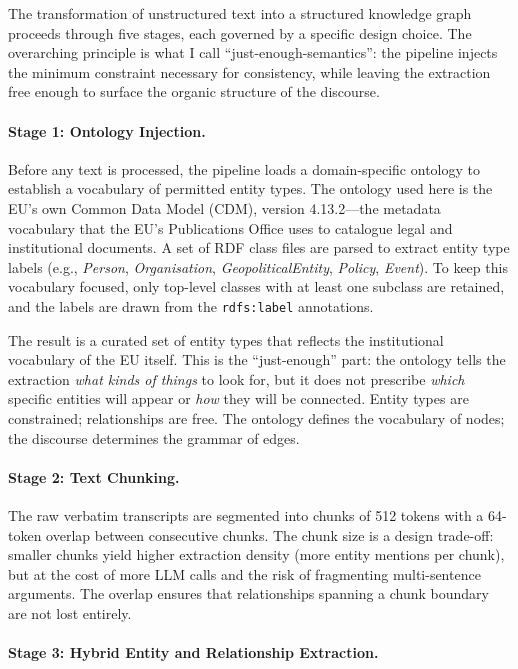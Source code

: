 \documentclass[11pt]{article}
\begin{document}
The transformation of unstructured text into a structured knowledge graph proceeds through five stages, each governed by a specific design choice. The overarching principle is what I call ``just-enough-semantics'': the pipeline injects the minimum constraint necessary for consistency, while leaving the extraction free enough to surface the organic structure of the discourse.


\paragraph{Stage 1: Ontology Injection.}

Before any text is processed, the pipeline loads a domain-specific ontology to establish a vocabulary of permitted entity types. The ontology used here is the EU's own Common Data Model (CDM), version 4.13.2---the metadata vocabulary that the EU's Publications Office uses to catalogue legal and institutional documents. A set of RDF class files are parsed to extract entity type labels (e.g., \emph{Person}, \emph{Organisation}, \emph{GeopoliticalEntity}, \emph{Policy}, \emph{Event}). To keep this vocabulary focused, only top-level classes with at least one subclass are retained, and the labels are drawn from the \texttt{rdfs:label} annotations.

The result is a curated set of entity types that reflects the institutional vocabulary of the EU itself. This is the ``just-enough'' part: the ontology tells the extraction \emph{what kinds of things} to look for, but it does not prescribe \emph{which} specific entities will appear or \emph{how} they will be connected. Entity types are constrained; relationships are free. The ontology defines the vocabulary of nodes; the discourse determines the grammar of edges.


\paragraph{Stage 2: Text Chunking.}

The raw verbatim transcripts are segmented into chunks of 512 tokens with a 64-token overlap between consecutive chunks. The chunk size is a design trade-off: smaller chunks yield higher extraction density (more entity mentions per chunk), but at the cost of more LLM calls and the risk of fragmenting multi-sentence arguments. The overlap ensures that relationships spanning a chunk boundary are not lost entirely.


\paragraph{Stage 3: Hybrid Entity and Relationship Extraction.}
\end{document}

